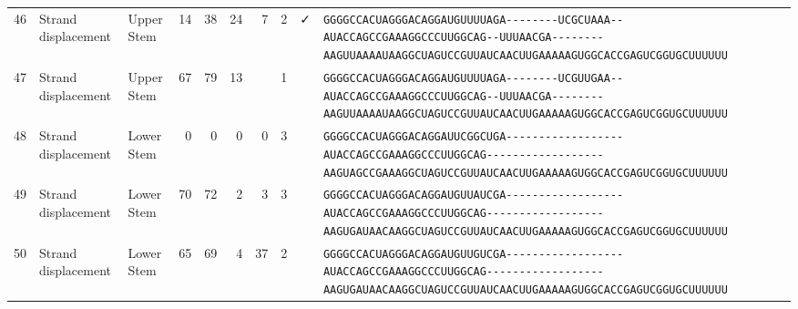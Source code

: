 \begin{tabular}{rllrrrrrcl}
 46 & Strand displacement & Upper Stem & 14 & 38 & 24 & 7 & 2 & ✓ &
 \color{ucsfdarkgrey}\verb|GGGGCCACUAGGGACAGGAU|\color{ucsforange}\verb|GUUUUA|\color{ucsfblue}\verb|GA--------UCGCUAAA--|\color{ucsfpurple}\verb|AUACCAGCCGAAAGGCCCUUGGCAG|\color{ucsfblue}\verb|--UUUAACGA--------AAGU|\color{ucsforange}\verb|UAAAAUAA|\color{ucsfnavy}\verb|GGCUAGUCC|\color{ucsforange}\verb|GUUAUCA|\color{ucsfteal}\verb|ACUUGAAAAAGUG|\color{ucsforange}\verb|GCACCGAGUCGGUGCUUUUUU| \\

 47 & Strand displacement & Upper Stem & 67 & 79 & 13 &  & 1 &  &
 \color{ucsfdarkgrey}\verb|GGGGCCACUAGGGACAGGAU|\color{ucsforange}\verb|GUUUUA|\color{ucsfblue}\verb|GA--------UCGUUGAA--|\color{ucsfpurple}\verb|AUACCAGCCGAAAGGCCCUUGGCAG|\color{ucsfblue}\verb|--UUUAACGA--------AAGU|\color{ucsforange}\verb|UAAAAUAA|\color{ucsfnavy}\verb|GGCUAGUCC|\color{ucsforange}\verb|GUUAUCA|\color{ucsfteal}\verb|ACUUGAAAAAGUG|\color{ucsforange}\verb|GCACCGAGUCGGUGCUUUUUU| \\

 48 & Strand displacement & Lower Stem & 0 & 0 & 0 & 0 & 3 &  &
 \color{ucsfdarkgrey}\verb|GGGGCCACUAGGGACAGGAU|\color{ucsforange}\verb|UCGGCU|\color{ucsfblue}\verb|GA------------------|\color{ucsfpurple}\verb|AUACCAGCCGAAAGGCCCUUGGCAG|\color{ucsfblue}\verb|------------------AAGU|\color{ucsforange}\verb|AGCCGAAA|\color{ucsfnavy}\verb|GGCUAGUCC|\color{ucsforange}\verb|GUUAUCA|\color{ucsfteal}\verb|ACUUGAAAAAGUG|\color{ucsforange}\verb|GCACCGAGUCGGUGCUUUUUU| \\

 49 & Strand displacement & Lower Stem & 70 & 72 & 2 & 3 & 3 &  &
 \color{ucsfdarkgrey}\verb|GGGGCCACUAGGGACAGGAU|\color{ucsforange}\verb|GUUAUC|\color{ucsfblue}\verb|GA------------------|\color{ucsfpurple}\verb|AUACCAGCCGAAAGGCCCUUGGCAG|\color{ucsfblue}\verb|------------------AAGU|\color{ucsforange}\verb|GAUAACAA|\color{ucsfnavy}\verb|GGCUAGUCC|\color{ucsforange}\verb|GUUAUCA|\color{ucsfteal}\verb|ACUUGAAAAAGUG|\color{ucsforange}\verb|GCACCGAGUCGGUGCUUUUUU| \\

 50 & Strand displacement & Lower Stem & 65 & 69 & 4 & 37 & 2 &  &
 \color{ucsfdarkgrey}\verb|GGGGCCACUAGGGACAGGAU|\color{ucsforange}\verb|GUUGUC|\color{ucsfblue}\verb|GA------------------|\color{ucsfpurple}\verb|AUACCAGCCGAAAGGCCCUUGGCAG|\color{ucsfblue}\verb|------------------AAGU|\color{ucsforange}\verb|GAUAACAA|\color{ucsfnavy}\verb|GGCUAGUCC|\color{ucsforange}\verb|GUUAUCA|\color{ucsfteal}\verb|ACUUGAAAAAGUG|\color{ucsforange}\verb|GCACCGAGUCGGUGCUUUUUU| \\


\end{tabular}
